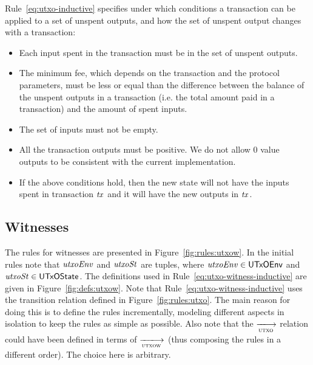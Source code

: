 Rule~\ref{eq:utxo-inductive} specifies under which conditions a transaction can
be applied to a set of unspent outputs, and how the set of unspent output
changes with a transaction:
\begin{itemize}
\item Each input spent in the transaction must be in the set of unspent
  outputs.
\item The minimum fee, which depends on the transaction and the protocol
  parameters, must be less or equal than the difference between the balance of
  the unspent outputs in a transaction (i.e. the total amount paid in a
  transaction) and the amount of spent inputs.
\item The set of inputs must not be empty.
\item All the transaction outputs must be positive. We do not allow $0$ value
  outputs to be consistent with the current implementation.
\item If the above conditions hold, then the new state will not have the inputs
  spent in transaction $\mathit{tx}$ and it will have the new outputs in
  $\mathit{tx}$.
\end{itemize}

\clearpage

\subsection{Witnesses}
\label{sec:witnesses}

The rules for witnesses are presented in Figure~\ref{fig:rules:utxow}. In the
initial rules note that $\mathit{utxoEnv}$ and $\mathit{utxoSt}$ are tuples, where
$\mathit{utxoEnv} \in \mathsf{UTxOEnv}$ and $\mathit{utxoSt} \in \mathsf{UTxOState}$. The definitions
used in Rule~\ref{eq:utxo-witness-inductive} are given in
Figure~\ref{fig:defs:utxow}. Note that Rule~\ref{eq:utxo-witness-inductive}
uses the transition relation defined in Figure~\ref{fig:rules:utxo}. The main
reason for doing this is to define the rules incrementally, modeling different
aspects in isolation to keep the rules as simple as possible. Also note that
the $\trans{utxo}{}$ relation could have been defined in terms of
$\trans{utxow}{}$ (thus composing the rules in a different order). The choice
here is arbitrary.

